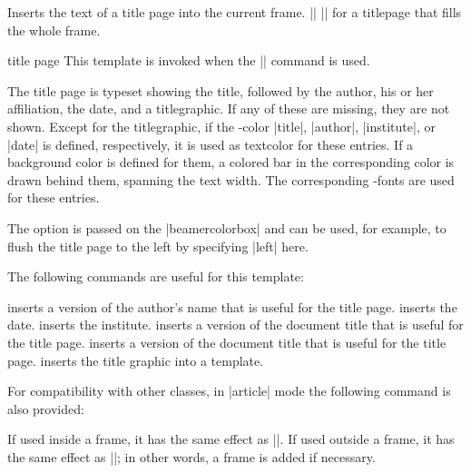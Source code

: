 \begin{command}{\titlepage}
  Inserts the text of a title page into the current frame.
  \example
  |\frame{\titlepage}|
  \example
  |\frame[plain]{\titlepage}| for a titlepage that fills the whole frame.

  \begin{element}{title page}\yes\yes\yes
    This template is invoked when the |\titlepage| command is used.

    \begin{templateoptions}
      The title page is typeset showing the title, followed by the author, his or her affiliation, the date, and a titlegraphic. If any of these are missing, they are not shown. Except for the titlegraphic, if the \beamer-color |title|, |author|, |institute|, or |date| is defined, respectively, it is used as textcolor for these entries. If a background color is defined for them, a colored bar in the corresponding color is drawn behind them, spanning the text width. The corresponding \beamer-fonts are used for these entries.

      The  option is passed on the |beamercolorbox| and can be used, for example, to flush the title page to the left by specifying |left| here.
    \end{templateoptions}

    The following commands are useful for this template:
    \begin{templateinserts}
      \iteminsert{\insertauthor} inserts a version of the author's name that is useful for the title page.
      \iteminsert{\insertdate} inserts the date.
      \iteminsert{\insertinstitute} inserts the institute.
      \iteminsert{\inserttitle} inserts a version of the document title that is useful for the title page.
      \iteminsert{\insertsubtitle} inserts a version of the document title that is useful for the title page.
      \iteminsert{\inserttitlegraphic} inserts the title graphic into a template.
    \end{templateinserts}
  \end{element}
\end{command}

For compatibility with other classes, in |article| mode the following command is also provided:

\begin{command}{\maketitle}
  \beamernote
  If used inside a frame, it has the same effect as |\titlepage|. If used outside a frame, it has the same effect as |\frame{\titlepage}|; in other words, a frame is added if necessary.
\end{command}

